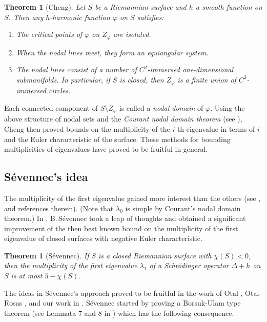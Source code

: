 \documentclass[a4paper,11pt]{amsart}
\numberwithin{equation}{section}
\newtheorem{thm}[equation]{Theorem}
\theoremstyle{definition}
\def\vf{\varphi}
\begin{document}
\begin{thm}[Cheng]\label{Cheng}
Let $S$ be a Riemannian surface and $h$ a smooth function on $S$.
Then any $h$-harmonic function $\vf$ on $S$ satisfies:
\begin{enumerate}
\item
The critical points of $\vf$ on $Z_\varphi$ are isolated.
\item
When the nodal lines meet, they form an equiangular system.
\item
The nodal lines consist of a number of $C^2$-immersed one-dimensional submanifolds.
In particular, if $S$ is closed, then $Z_\vf$ is a finite union of $C^2$-immersed circles.
\end{enumerate}
\end{thm}

Each connected component of $S\setminus Z_\vf$ is called a \emph{nodal domain} of $\vf$.
Using the above structure of nodal sets and the \emph{Courant nodal domain theorem} (see \cite{Che}),
Cheng then proved bounds on the multiplicity of the $i$-th eigenvalue in terms of $i$ and the Euler characteristic of the surface.
These methods for bounding multiplicities of eigenvalues have proved to be fruitful in general. 

\subsection{S\'{e}vennec's idea}\label{sevennec}

The multiplicity of the first eigenvalue gained more interest than the others (see \cite{C}, \cite{Se} and references therein).
(Note that $\lambda_0$ is simple by Courant's nodal domain theorem.)
In \cite{Se}, B.\,S\'{e}vennec took a leap of thoughts and obtained  a significant improvement of the then best known bound on the multiplicity of the first eigenvalue of closed surfaces with negative Euler characteristic.

\begin{thm}[S\'{e}vennec]\label{seven}
If $S$ is a closed Riemannian surface with $\chi(S)<0$, then the multiplicity of the first eigenvalue $\lambda_1$ of a Schr\"odinger operator $\Delta+h$ on $S$ is at most $5-\chi(S)$.
\end{thm}

The ideas in S\'{e}vennec's approach proved to be fruitful in the work of Otal \cite{Ot}, Otal-Rosas \cite{OR}, and our work in \cite{BMM1,BMM2}.
S\'{e}vennec started by proving a Borsuk-Ulam type theorem (see Lemmata 7 and 8 in \cite{Se}) which has the following consequence.
\end{document}
